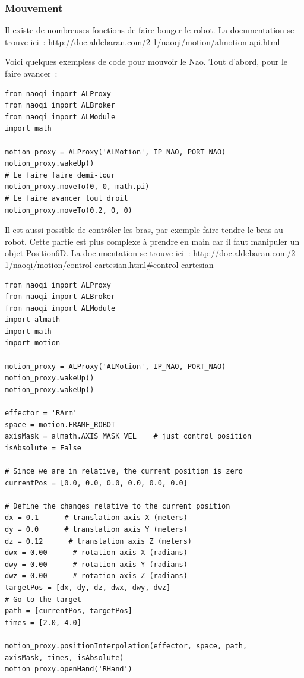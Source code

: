 \documentclass{article}
\begin{document}
\subsubsection{Mouvement}
Il existe de nombreuses fonctions de faire bouger le robot. La documentation se trouve ici~: \url{http://doc.aldebaran.com/2-1/naoqi/motion/almotion-api.html}

Voici quelques exempless de code pour mouvoir le Nao. Tout d'abord, pour le faire avancer~:
\begin{verbatim}
from naoqi import ALProxy
from naoqi import ALBroker
from naoqi import ALModule
import math

motion_proxy = ALProxy('ALMotion', IP_NAO, PORT_NAO)
motion_proxy.wakeUp()
# Le faire faire demi-tour
motion_proxy.moveTo(0, 0, math.pi)
# Le faire avancer tout droit
motion_proxy.moveTo(0.2, 0, 0)
\end{verbatim}

Il est aussi possible de contrôler les bras, par exemple faire tendre le bras au robot. Cette partie est plus complexe à prendre en main car il faut manipuler un objet Position6D. La documentation se trouve ici~: \url{http://doc.aldebaran.com/2-1/naoqi/motion/control-cartesian.html#control-cartesian}
\begin{verbatim}
from naoqi import ALProxy
from naoqi import ALBroker
from naoqi import ALModule
import almath
import math
import motion

motion_proxy = ALProxy('ALMotion', IP_NAO, PORT_NAO)
motion_proxy.wakeUp()
motion_proxy.wakeUp()

effector = 'RArm'
space = motion.FRAME_ROBOT
axisMask = almath.AXIS_MASK_VEL    # just control position
isAbsolute = False

# Since we are in relative, the current position is zero
currentPos = [0.0, 0.0, 0.0, 0.0, 0.0, 0.0]

# Define the changes relative to the current position
dx = 0.1      # translation axis X (meters)
dy = 0.0      # translation axis Y (meters)
dz = 0.12      # translation axis Z (meters)
dwx = 0.00      # rotation axis X (radians)
dwy = 0.00      # rotation axis Y (radians)
dwz = 0.00      # rotation axis Z (radians)
targetPos = [dx, dy, dz, dwx, dwy, dwz]
# Go to the target
path = [currentPos, targetPos]
times = [2.0, 4.0]

motion_proxy.positionInterpolation(effector, space, path,
axisMask, times, isAbsolute)
motion_proxy.openHand('RHand')
\end{verbatim}
\end{document}
